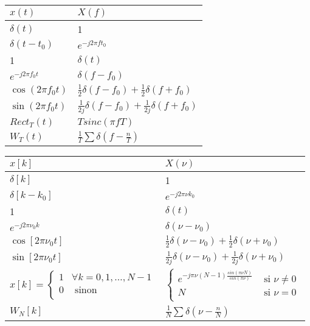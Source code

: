 \documentclass{article}
\begin{document}
\begin{table}[!ht]
    \centering
    \begin{tabular}{|l|l|}
        \hline
        $x(t)$ & $X(f)$ \\ \hline
        $\delta(t)$ & 1 \\ \hline
        $\delta(t - t_0)$ & $e^{-j 2 \pi f t_0}$ \\ \hline
        1 & $\delta(t)$ \\ \hline
        $e^{-j 2 \pi f_0 t}$ & $\delta(f - f_0)$ \\ \hline
        $\cos (2 \pi f_0t)$ & $\frac{1}{2}\delta(f - f_0) + \frac{1}{2}\delta (f + f_0)$ \\ \hline
        $\sin (2 \pi f_0t)$ & $\frac{1}{2j}\delta(f - f_0) + \frac{1}{2j}\delta (f + f_0)$ \\ \hline
        $Rect_T (t)$ & $T sinc (\pi f T)$ \\ \hline
        $W_T(t)$ & $\frac{1}{T} \sum \delta(f - \frac{n}{T})$ \\ \hline
    \end{tabular}
\end{table}


\begin{table}[!ht]
    \centering
    \begin{tabular}{|l|l|}
    \hline
        $x[k]$ & $X(\nu)$ \\ \hline
        $\delta[k]$ & 1 \\ \hline
        $\delta[k - k_0]$ & $e^{-j 2 \pi \nu k_0}$ \\ \hline
        1 & $\delta(t)$ \\ \hline
        $e^{-j 2 \pi \nu_0 k}$ & $\delta(\nu - \nu_0)$ \\ \hline
        $\cos [2 \pi \nu_0t]$ & $\frac{1}{2}\delta(\nu -\nu_0) + \frac{1}{2}\delta (\nu +\nu_0)$ \\ \hline
        $\sin [2 \pi \nu_0t]$ & $\frac{1}{2j}\delta(\nu -\nu_0) + \frac{1}{2j}\delta (\nu +\nu_0)$ \\ \hline
        $x[k] = \begin{cases}
            1 & \forall k = 0, 1, \dots, N-1\\
            0 &\text{ sinon}\\
        \end{cases} $ & $\begin{cases}
        e^{-j \pi \nu (N-1) \frac{sin(\pi \nu N)}{sin(\pi \nu )}} &\text{ si } \nu \neq 0\\
        N                                                          &\text{ si } \nu  = 0\\
        \end{cases} $ \\ \hline
        $W_N[k]$ & $\frac{1}{N} \sum \delta(\nu - \frac{n}{N})$ \\ \hline
    \end{tabular}
\end{table}
\end{document}
